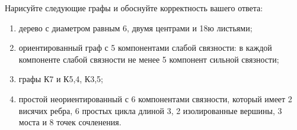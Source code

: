 \question 
Нарисуйте следующие графы и обоснуйте корректность вашего ответа:
\begin{enumerate}
\item  дерево с диаметром равным 6, двумя центрами  и  18ю листьями;
\item  ориентированный граф с 5 компонентами слабой связности: в  каждой компоненте слабой связности не менее 5 компонент сильной связности;
\item  графы К7 и К5,4, К3,5;
\item  простой неориентированный с 6 компонентами связности, который имеет 2 висячих ребра, 6 простых цикла длиной 3, 2 изолированные вершины, 3 моста и 8 точек сочленения.
\end{enumerate}